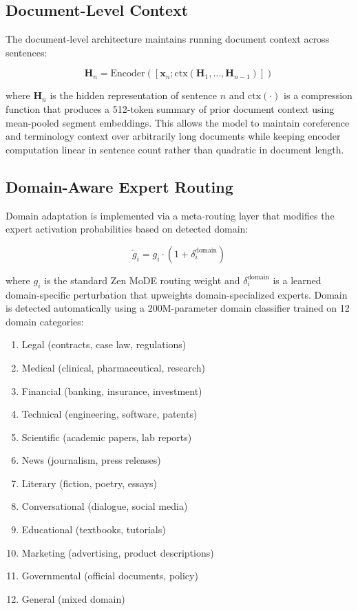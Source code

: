 \documentclass[11pt,a4paper]{article}
\begin{document}
\subsection{Document-Level Context}

The document-level architecture maintains running document context across sentences:

\begin{equation}
\mathbf{H}_n = \text{Encoder}\!\left([\mathbf{x}_n; \text{ctx}(\mathbf{H}_1, \ldots, \mathbf{H}_{n-1})]\right)
\end{equation}

where $\mathbf{H}_n$ is the hidden representation of sentence $n$ and
$\text{ctx}(\cdot)$ is a compression function that produces a 512-token summary of
prior document context using mean-pooled segment embeddings. This allows the model
to maintain coreference and terminology context over arbitrarily long documents while
keeping encoder computation linear in sentence count rather than quadratic in document length.

\subsection{Domain-Aware Expert Routing}

Domain adaptation is implemented via a meta-routing layer that modifies the expert
activation probabilities based on detected domain:

\begin{equation}
\tilde{g}_i = g_i \cdot (1 + \delta_i^{\text{domain}})
\end{equation}

where $g_i$ is the standard Zen MoDE routing weight and $\delta_i^{\text{domain}}$
is a learned domain-specific perturbation that upweights domain-specialized experts.
Domain is detected automatically using a 200M-parameter domain classifier trained on
12 domain categories:

\begin{enumerate}
\item Legal (contracts, case law, regulations)
\item Medical (clinical, pharmaceutical, research)
\item Financial (banking, insurance, investment)
\item Technical (engineering, software, patents)
\item Scientific (academic papers, lab reports)
\item News (journalism, press releases)
\item Literary (fiction, poetry, essays)
\item Conversational (dialogue, social media)
\item Educational (textbooks, tutorials)
\item Marketing (advertising, product descriptions)
\item Governmental (official documents, policy)
\item General (mixed domain)
\end{enumerate}
\end{document}
